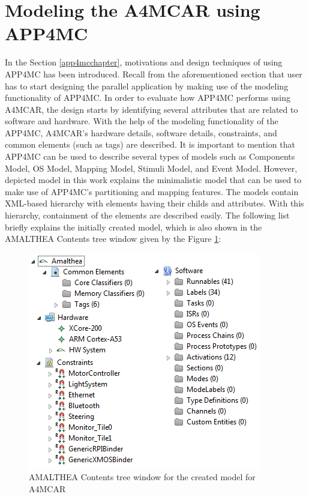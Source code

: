 \section{Modeling the A4MCAR using APP4MC}
In the Section \ref{app4mcchapter}, motivations and design techniques of using APP4MC has been introduced. Recall from the aforementioned section that user has to start designing the parallel application by making use of the modeling functionality of APP4MC. In order to evaluate how APP4MC performs using A4MCAR, the design starts by identifying several attributes that are related to software and hardware. With the help of the modeling functionality of the APP4MC, A4MCAR's hardware details, software details, constraints, and common elements (such as tags) are described. It is important to mention that APP4MC can be used to describe several types of models such as Components Model, OS Model, Mapping Model, Stimuli Model, and Event Model. However, depicted model in this work explains the minimalistic model that can be used to make use of APP4MC's partitioning and mapping features. The models contain XML-based hierarchy with elements having their childs and attributes. With this hierarchy, containment of the elements are described easily. The following list briefly explains the initially created model, which is also shown in the AMALTHEA Contents tree window given by the Figure \ref{fig:overallmodel}:
\begin{figure}[!ht]
	\centering
	\captionsetup{justification=centering}
	\includegraphics[scale=0.8]{content/images/overallmodel.png}
	\caption{AMALTHEA Contents tree window for the created model for A4MCAR}
	\label{fig:overallmodel}
\end{figure}
